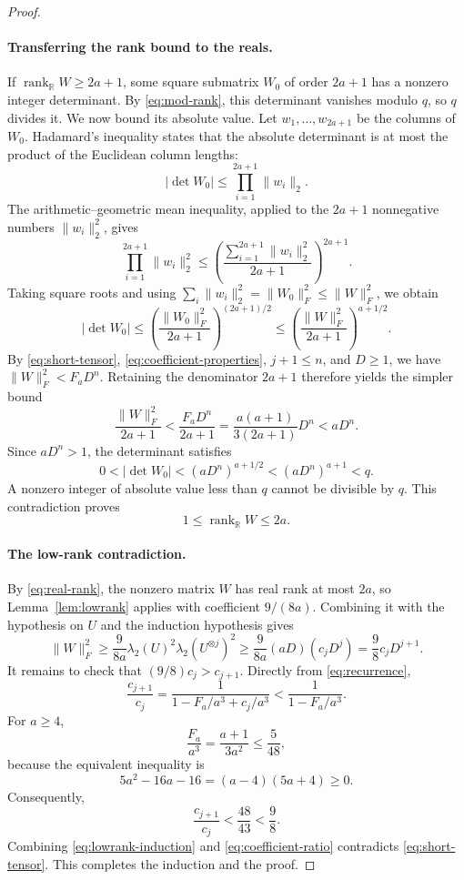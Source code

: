 \documentclass[11pt,letterpaper]{article}
\numberwithin{equation}{section}
\theoremstyle{definition}
\theoremstyle{remark}
\DeclareMathOperator{\rank}{rank}
\newcommand{\R}{\mathbb R}
\begin{document}
\begin{proof}
\paragraph{Transferring the rank bound to the reals.}
If $\rank_{\R}W\ge2a+1$, some square submatrix $W_0$ of order $2a+1$ has a nonzero integer determinant. By \eqref{eq:mod-rank}, this determinant vanishes modulo $q$, so $q$ divides it. We now bound its absolute value. Let $w_1,\ldots,w_{2a+1}$ be the columns of $W_0$. Hadamard's inequality states that the absolute determinant is at most the product of the Euclidean column lengths:
\[
 |\det W_0|\le\prod_{i=1}^{2a+1}\|w_i\|_2.
\]
The arithmetic--geometric mean inequality, applied to the $2a+1$ nonnegative numbers $\|w_i\|_2^2$, gives
\[
 \prod_{i=1}^{2a+1}\|w_i\|_2^2
 \le\left(\frac{\sum_{i=1}^{2a+1}\|w_i\|_2^2}{2a+1}\right)^{2a+1}.
\]
Taking square roots and using $\sum_i\|w_i\|_2^2=\|W_0\|_F^2\le\|W\|_F^2$, we obtain
\[
 |\det W_0|
 \le\left(\frac{\|W_0\|_F^2}{2a+1}\right)^{(2a+1)/2}
 \le\left(\frac{\|W\|_F^2}{2a+1}\right)^{a+1/2}.
\]
By \eqref{eq:short-tensor}, \eqref{eq:coefficient-properties}, $j+1\le n$, and $D\ge1$, we have $\|W\|_F^2<F_aD^n$. Retaining the denominator $2a+1$ therefore yields the simpler bound
\[
 \frac{\|W\|_F^2}{2a+1}
 <\frac{F_aD^n}{2a+1}
 =\frac{a(a+1)}{3(2a+1)}D^n
 <aD^n.
\]
Since $aD^n>1$, the determinant satisfies
\[
 0<|\det W_0|<(aD^n)^{a+1/2}<(aD^n)^{a+1}<q.
\]
A nonzero integer of absolute value less than $q$ cannot be divisible by $q$. This contradiction proves
\begin{equation}\label{eq:real-rank}
 1\le\rank_{\R}W\le2a.
\end{equation}
\paragraph{The low-rank contradiction.}
By \eqref{eq:real-rank}, the nonzero matrix $W$ has real rank at most $2a$, so Lemma~\ref{lem:lowrank} applies with coefficient $9/(8a)$. Combining it with the hypothesis on $U$ and the induction hypothesis gives
\begin{equation}\label{eq:lowrank-induction}
 \|W\|_F^2\ge\frac9{8a}\lambda_2(U)^2\lambda_2(U^{\otimes j})^2
 \ge\frac9{8a}(aD)(c_jD^j)
 =\frac98c_jD^{j+1}.
\end{equation}
It remains to check that $(9/8)c_j>c_{j+1}$. Directly from \eqref{eq:recurrence},
\[
 \frac{c_{j+1}}{c_j}
 =\frac1{1-F_a/a^3+c_j/a^3}
 <\frac1{1-F_a/a^3}.
\]
For $a\ge4$,
\[
 \frac{F_a}{a^3}=\frac{a+1}{3a^2}\le\frac5{48},
\]
because the equivalent inequality is
\[
 5a^2-16a-16=(a-4)(5a+4)\ge0.
\]
Consequently,
\begin{equation}\label{eq:coefficient-ratio}
 \frac{c_{j+1}}{c_j}<\frac{48}{43}<\frac98.
\end{equation}
Combining \eqref{eq:lowrank-induction} and \eqref{eq:coefficient-ratio} contradicts \eqref{eq:short-tensor}. This completes the induction and the proof.
\end{proof}
\end{document}
